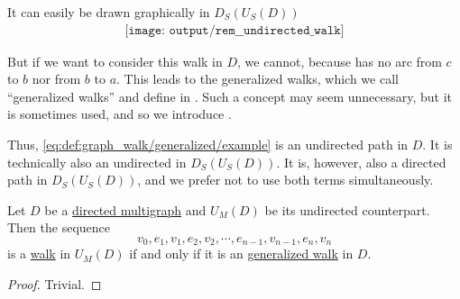 \begin{remark}
  It can easily be drawn graphically in \( D_S(U_S(D)) \)
  \begin{equation*}
    \begin{aligned}
      \texttt{[image: output/rem\_\_undirected\_walk]}
    \end{aligned}
  \end{equation*}

  But if we want to consider this walk in \( D \), we cannot, because has no arc from \( c \) to \( b \) nor from \( b \) to \( a \). This leads to the generalized walks, which we call \enquote{generalized walks} and define in . Such a concept may seem unnecessary, but it is sometimes used, and so we introduce .

  Thus, \eqref{eq:def:graph_walk/generalized/example} is an undirected path in \( D \). It is technically also an undirected in \( D_S(U_S(D)) \). It is, however, also a directed path in \( D_S(U_S(D)) \), and we prefer not to use both terms simultaneously.
\end{remark}

\begin{proposition}\label{thm:walk_in_undirected_counterpart}
  Let \( D \) be a \hyperref[def:directed_multigraph]{directed multigraph} and \( \hyperref[def:graph_functors/multi_forgetful]{U_M}(D) \) be its undirected counterpart. Then the sequence
  \begin{equation*}
    v_0, e_1, v_1, e_2, v_2, \cdots, e_{n-1}, v_{n-1}, e_n, v_n
  \end{equation*}
  is a \hyperref[def:graph_walk/undirected]{walk} in \( \hyperref[def:graph_functors/multi_forgetful]{U_M}(D) \) if and only if it is an \hyperref[def:graph_walk/generalized]{generalized walk} in \( D \).
\end{proposition}
\begin{proof}
  Trivial.
\end{proof}

